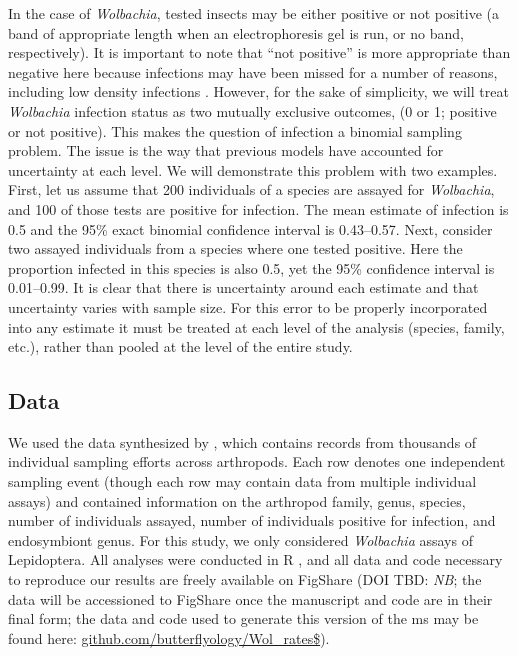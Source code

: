 \documentclass{frontiersSCNS}
\begin{document}
In the case of \textit{Wolbachia}, tested insects may be either positive or not positive (a band of appropriate length when an electrophoresis gel is run, or no band, respectively). It is important to note that ``not positive'' is more appropriate than negative here because infections may have been missed for a number of reasons, including low density infections \citep{Schneider:2014jv}. However, for the sake of simplicity, we will treat \textit{Wolbachia} infection status as two mutually exclusive outcomes, (0 or 1; positive or not positive). This makes the question of infection a binomial sampling problem. The issue is the way that previous models have accounted for uncertainty at each level. We will demonstrate this problem with two examples. First, let us assume that 200 individuals of a species are assayed for \textit{Wolbachia}, and 100 of those tests are positive for infection. The mean estimate of infection is 0.5 and the 95\% exact binomial confidence interval is 0.43--0.57. Next, consider two assayed individuals from a species where one tested positive. Here the proportion infected in this species is also 0.5, yet the 95\% confidence interval is 0.01--0.99. It is clear that there is uncertainty around each estimate and that uncertainty varies with sample size. For this error to be properly incorporated into any estimate it must be treated at each level of the analysis (species, family, etc.), rather than pooled at the level of the entire study. 

\subsection{Data}
We used the data synthesized by \citet{Weinert:2015aa}, which contains records from thousands of individual sampling efforts across arthropods.  Each row denotes one independent sampling event (though each row may contain data from multiple individual assays) and contained information on the arthropod family, genus, species, number of individuals assayed, number of individuals positive for infection, and endosymbiont genus. For this study, we only considered \textit{Wolbachia} assays of Lepidoptera. All analyses were conducted in R \cite[\emph{v3.2}]{R-Core-Team:2016aa}, and all data and code necessary to reproduce our results are freely available on FigShare (DOI TBD: \textit{NB}; the data will be accessioned to FigShare once the manuscript and code are in their final form; the data and code used to generate this version of the ms may be found here: \url{github.com/butterflyology/Wol_rates$}).
\end{document}
